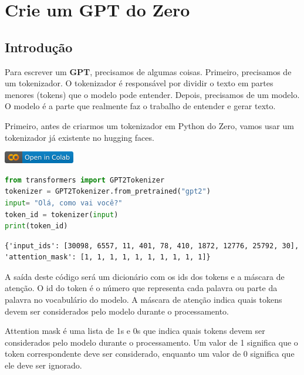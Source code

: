 \documentclass[14pt,a4paper,oneside]{book}
\begin{document}
\chapter{Crie um GPT do Zero}

\section{Introdução}

Para escrever um \textbf{GPT}, precisamos de algumas coisas. 
Primeiro, precisamos de um tokenizador. O tokenizador é responsável por dividir o texto em partes menores (tokens) que o modelo pode entender. Depois, precisamos de um modelo. O modelo é a parte que realmente faz o trabalho de entender e gerar texto.

Primeiro, antes de criarmos um tokenizador em Python do Zero, vamos usar um tokenizador já existente no hugging faces.

\vspace{\baselineskip}
\href{https://colab.research.google.com/github/giseldo/chatbotbook_v2/blob/main/notebook/cap13.ipynb}{
  \includegraphics{./fig/colab-badge.png}
}

\begin{lstlisting}[language=Python, caption=Usando o tokenizador do GPT-2, label=lst:usando_tokenizer_gpt2]
from transformers import GPT2Tokenizer
tokenizer = GPT2Tokenizer.from_pretrained("gpt2")
input= "Olá, como vai você?"	
token_id = tokenizer(input)
print(token_id)
\end{lstlisting}

\begin{lstlisting}
{'input_ids': [30098, 6557, 11, 401, 78, 410, 1872, 12776, 25792, 30], 'attention_mask': [1, 1, 1, 1, 1, 1, 1, 1, 1, 1]}
\end{lstlisting}

A saída deste código será um dicionário com os ids dos tokens e a máscara de atenção. O id do token é o número que representa cada palavra ou parte da palavra no vocabulário do modelo. A máscara de atenção indica quais tokens devem ser considerados pelo modelo durante o processamento.

Attention mask é uma lista de 1s e 0s que indica quais tokens devem ser considerados pelo modelo durante o processamento. Um valor de 1 significa que o token correspondente deve ser considerado, enquanto um valor de 0 significa que ele deve ser ignorado.




\end{document}
